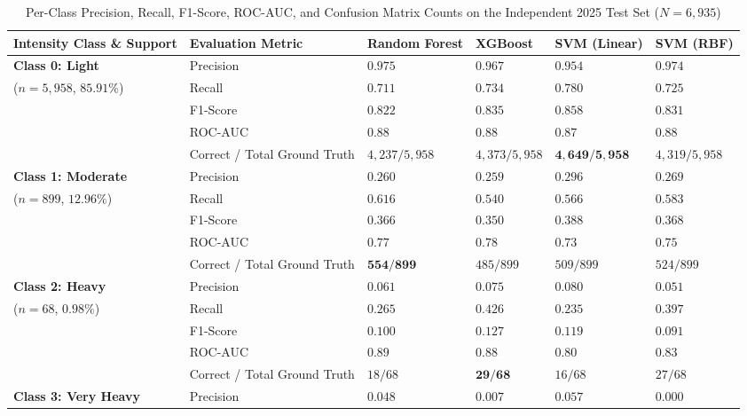 \documentclass[conference]{IEEEtran}
\begin{document}
\begin{table}[!tbp]
\caption{Per-Class Precision, Recall, F1-Score, ROC-AUC, and Confusion Matrix Counts on the Independent 2025 Test Set ($N = 6{,}935$)}
\label{tab:per_class_test}
\centering
\vspace{3pt}
{\footnotesize
\renewcommand{\arraystretch}{1.18}\setlength{\tabcolsep}{5pt}%
\begin{tabularx}{\textwidth}{|p{3.8cm}|p{2.8cm}|Y|Y|Y|Y|}
\hline
\textbf{Intensity Class \& Support} & \textbf{Evaluation Metric} & \textbf{Random Forest} & \textbf{XGBoost} & \textbf{SVM (Linear)} & \textbf{SVM (RBF)} \\
\hline
\textbf{Class 0: Light} & Precision & $0.975$ & $0.967$ & $0.954$ & $\mathbf{0.974}$ \\
($n = 5{,}958$, $85.91\%$) & Recall & $0.711$ & $0.734$ & $\mathbf{0.780}$ & $0.725$ \\
& F1-Score & $0.822$ & $0.835$ & $\mathbf{0.858}$ & $0.831$ \\
& ROC-AUC & $\mathbf{0.88}$ & $\mathbf{0.88}$ & $0.87$ & $\mathbf{0.88}$ \\
& Correct / Total Ground Truth & $4{,}237 / 5{,}958$ & $4{,}373 / 5{,}958$ & $\mathbf{4{,}649 / 5{,}958}$ & $4{,}319 / 5{,}958$ \\
\hline
\textbf{Class 1: Moderate} & Precision & $0.260$ & $0.259$ & $\mathbf{0.296}$ & $0.269$ \\
($n = 899$, $12.96\%$) & Recall & $\mathbf{0.616}$ & $0.540$ & $0.566$ & $0.583$ \\
& F1-Score & $0.366$ & $0.350$ & $\mathbf{0.388}$ & $0.368$ \\
& ROC-AUC & $0.77$ & $\mathbf{0.78}$ & $0.73$ & $0.75$ \\
& Correct / Total Ground Truth & $\mathbf{554 / 899}$ & $485 / 899$ & $509 / 899$ & $524 / 899$ \\
\hline
\textbf{Class 2: Heavy} & Precision & $0.061$ & $0.075$ & $\mathbf{0.080}$ & $0.051$ \\
($n = 68$, $0.98\%$) & Recall & $0.265$ & $\mathbf{0.426}$ & $0.235$ & $0.397$ \\
& F1-Score & $0.100$ & $\mathbf{0.127}$ & $0.119$ & $0.091$ \\
& ROC-AUC & $\mathbf{0.89}$ & $0.88$ & $0.80$ & $0.83$ \\
& Correct / Total Ground Truth & $18 / 68$ & $\mathbf{29 / 68}$ & $16 / 68$ & $27 / 68$ \\
\hline
\textbf{Class 3: Very Heavy} & Precision & $0.048$ & $0.007$ & $\mathbf{0.057}$ & $0.000$ \\

\end{tabularx}}
\end{table}
\end{document}
